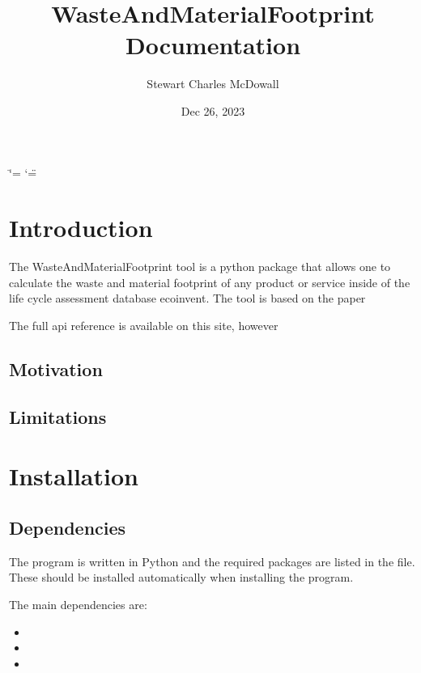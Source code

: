 \documentclass[letterpaper,10pt,english]{sphinxmanual}
\title{WasteAndMaterialFootprint Documentation}
\date{Dec 26, 2023}
\author{Stewart Charles McDowall}
\begin{document}
\ifdefined\shorthandoff
  \ifnum\catcode`\=\string=\active\shorthandoff{=}\fi
  \ifnum\catcode`\"=\active{}\fi
\fi

\pagestyle{empty}
\sphinxmaketitle
\pagestyle{plain}
\sphinxtableofcontents
\pagestyle{normal}
\label{\detokenize{index::doc}}


\sphinxstepscope


\chapter{Introduction}
\label{\detokenize{intro:introduction}}\label{\detokenize{intro::doc}}
\sphinxAtStartPar
The WasteAndMaterialFootprint tool is a python package that allows one to calculate the waste and material footprint of any product or service inside of the life cycle assessment database ecoinvent. The tool is based on the paper

\sphinxAtStartPar
{}

\sphinxAtStartPar
The full api reference is available on this site, however


\section{Motivation}
\label{\detokenize{intro:motivation}}

\section{Limitations}
\label{\detokenize{intro:limitations}}
\sphinxstepscope


\chapter{Installation}
\label{\detokenize{installation:installation}}\label{\detokenize{installation::doc}}

\section{Dependencies}
\label{\detokenize{installation:dependencies}}
\sphinxAtStartPar
The program is written in Python and the required packages are listed in the  file. These should be installed automatically when installing the program.

\sphinxAtStartPar
The main dependencies are:
\begin{itemize}
\item {} 
\sphinxAtStartPar
{}

\item {} 
\sphinxAtStartPar
{}

\item {} 
\sphinxAtStartPar
{}

\end{itemize}
\end{document}
